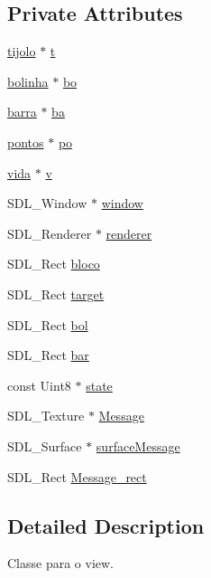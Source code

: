 \subsection*{Private Attributes}
\begin{DoxyCompactItemize}
\item 
\hyperlink{classtijolo}{tijolo} $\ast$ \hyperlink{classview_a952fdfafefca2c0bfc8b17647a5706be}{t}
\item 
\hyperlink{classbolinha}{bolinha} $\ast$ \hyperlink{classview_a9d44d190dd69b906bfeaac4559ee454e}{bo}
\item 
\hyperlink{classbarra}{barra} $\ast$ \hyperlink{classview_a0fd146110ca95e73f43c1dbda5a41294}{ba}
\item 
\hyperlink{classpontos}{pontos} $\ast$ \hyperlink{classview_a8dc345a9799a79220ecca66c4cd3e8ff}{po}
\item 
\hyperlink{classvida}{vida} $\ast$ \hyperlink{classview_ae0f8e281f5f7937d84f435437ce03546}{v}
\item 
S\+D\+L\+\_\+\+Window $\ast$ \hyperlink{classview_ade09c2dbabd1bf59ffaf625156c514f0}{window}
\item 
S\+D\+L\+\_\+\+Renderer $\ast$ \hyperlink{classview_a8d7b3ec0a0641d24cdc3b04949f5df45}{renderer}
\item 
S\+D\+L\+\_\+\+Rect \hyperlink{classview_ae22fb0558e890ff6ace089b603e2d6d8}{bloco}
\item 
S\+D\+L\+\_\+\+Rect \hyperlink{classview_a49a628eedba666db008f8c07b96e3a51}{target}
\item 
S\+D\+L\+\_\+\+Rect \hyperlink{classview_a72e360ef18105e2c565f17be3768027d}{bol}
\item 
S\+D\+L\+\_\+\+Rect \hyperlink{classview_a9c94bf9b55b5c24c5a9289d82a969ebb}{bar}
\item 
const Uint8 $\ast$ \hyperlink{classview_a6fd7fc350d9ad94dfd47e324b107e8ce}{state}
\item 
S\+D\+L\+\_\+\+Texture $\ast$ \hyperlink{classview_aadc622a973e820e57a79e603e6675c34}{Message}
\item 
S\+D\+L\+\_\+\+Surface $\ast$ \hyperlink{classview_a33f594a367a3616507115acc1f88c9ae}{surface\+Message}
\item 
S\+D\+L\+\_\+\+Rect \hyperlink{classview_a4a55ee9d6b1577f7bbff8290cf6013f9}{Message\+\_\+rect}
\end{DoxyCompactItemize}


\subsection{Detailed Description}
Classe para o view. 


